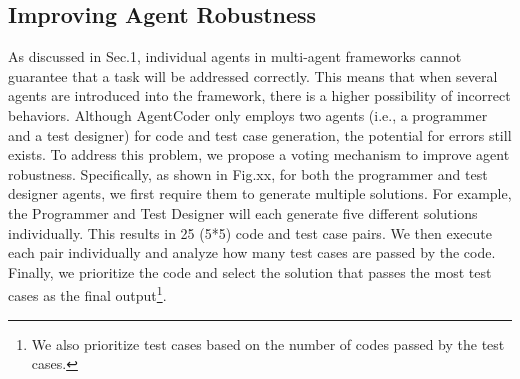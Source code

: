 \documentclass[manuscript,screen,review]{acmart}
\begin{document}

{\color{red}
\subsection{Improving Agent Robustness}
As discussed in Sec.1, individual agents in multi-agent frameworks cannot guarantee that a task will be addressed correctly. This means that when several agents are introduced into the framework, there is a higher possibility of incorrect behaviors. Although AgentCoder only employs two agents (i.e., a programmer and a test designer) for code and test case generation, the potential for errors still exists. To address this problem, we propose a voting mechanism to improve agent robustness. Specifically, as shown in Fig.xx, for both the programmer and test designer agents, we first require them to generate multiple solutions. For example, the Programmer and Test Designer will each generate five different solutions individually. This results in 25 (5*5) code and test case pairs. We then execute each pair individually and analyze how many test cases are passed by the code. Finally, we prioritize the code and select the solution that passes the most test cases as the final output\footnote{We also prioritize test cases based on the number of codes passed by the test cases.}.
}
\end{document}
